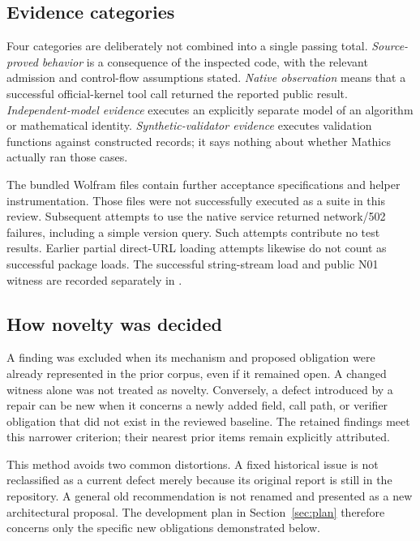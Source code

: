 \documentclass[11pt,letterpaper]{article}
\begin{document}
\subsection{Evidence categories}

Four categories are deliberately not combined into a single passing total.
\emph{Source-proved behavior} is a consequence of the inspected code, with the
relevant admission and control-flow assumptions stated. \emph{Native observation}
means that a successful official-kernel tool call returned the reported public
result. \emph{Independent-model evidence} executes an explicitly separate model
of an algorithm or mathematical identity. \emph{Synthetic-validator evidence}
executes validation functions against constructed records; it says nothing about
whether Mathics actually ran those cases.

The bundled Wolfram files contain further acceptance specifications and helper
instrumentation. Those files were not successfully executed as a suite in this
review. Subsequent attempts to use the native service returned network/502
failures, including a simple version query. Such attempts contribute no test
results. Earlier partial direct-URL loading attempts likewise do not count as
successful package loads. The successful string-stream load and public N01
witness are recorded separately in .

\subsection{How novelty was decided}

A finding was excluded when its mechanism and proposed obligation were already
represented in the prior corpus, even if it remained open. A changed witness
alone was not treated as novelty. Conversely, a defect introduced by a repair can
be new when it concerns a newly added field, call path, or verifier obligation
that did not exist in the reviewed baseline. The retained findings meet this
narrower criterion; their nearest prior items remain explicitly attributed.

This method avoids two common distortions. A fixed historical issue is not
reclassified as a current defect merely because its original report is still in
the repository. A general old recommendation is not renamed and presented as a
new architectural proposal. The development plan in Section~\ref{sec:plan}
therefore concerns only the specific new obligations demonstrated below.
\end{document}

